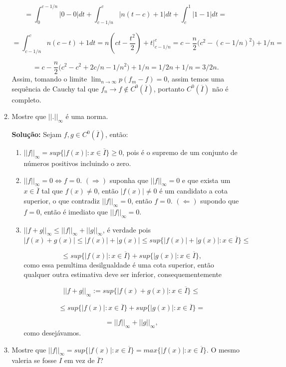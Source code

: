 \documentclass{article}
\begin{document}
\begin{enumerate}
\begin{enumerate}
			$$
			= \int_{0}^{c-1/n}|0 - 0|dt + \int_{c-1/n}^{c}|n(t-c)+1|dt + \int_{c}^{1}|1-1|dt=  
			$$ 
			
			$$
			= \int_{c-1/n}^{c}n(c-t)+1 dt =  n(ct - \frac{t^2}{2}) + t\Big|_{c-1/n}^{c} =  c - \frac{n}{2}\Big(c^2 - (c-1/n)^2 \Big) + 1/n=
			$$
			
			$$
			=  c - \frac{n}{2}\Big(c^2 - c^2+2c/n - 1/n^2  \Big)+ 1/n= 1/2n + 1/n = 3/2n.
			$$
			Assim, tomando o limite $\lim_{n \to \infty}p(f_m - f) = 0$, assim temos uma sequência de Cauchy tal que $f_n \to f \notin C^0(\overline{I})$, portanto $C^0(\overline{I})$ não é completo.
			
			\item Mostre que $||.||_{\infty}$ é uma norma.
			
			\textbf{Solução:} Sejam $f, g \in C^0(\overline{I})$, então:
			\begin{enumerate}
				\item $||f||_{\infty} =  sup\{|f(x)|: x \in \overline{I}\} \geq 0$, pois é o supremo de um conjunto de números positivos incluindo o zero.
				
				\item $||f||_{\infty} =  0 \iff f = 0$. $(\Rightarrow)$ suponha que $||f||_{\infty} =  0$ e que exista um $x \in \overline{I}$ tal que $f(x) \neq 0$, então $|f(x)| \neq 0$ é um candidato a cota superior, o que contradiz $||f||_{\infty} =  0$, então $f=0$. $(\Leftarrow)$ supondo que $f=0$, então é imediato que $||f||_{\infty} =  0$.
				
				\item $||f + g||_{\infty} \leq ||f||_{\infty} + ||g||_{\infty}$, é verdade pois 
				$$
				|f(x) +g(x)|\leq |f(x)| +|g(x)| \leq  sup\{|f(x)|+|g(x)|: x \in \overline{I}\} \leq 
				$$
				
				$$
				\leq sup\{|f(x)|: x \in \overline{I}\} + sup\{|g(x)|: x \in \overline{I}\},
				$$
				como essa penultima desilgualdade é uma cota superior, então qualquer outra estimativa deve ser inferior, consequementemente 
				
				$$
				||f+g||_{\infty} := sup\{|f(x)+g(x)|: x \in \overline{I}\}  \leq 
				$$
				
				$$ 
				\leq sup\{|f(x)|: x \in \overline{I}\} + sup\{|g(x)|: x \in \overline{I}\} = 
				$$ 
				
				$$=||f||_{\infty} + ||g||_{\infty},$$
				como desejávamos.
			\end{enumerate}
			
			\item Mostre que $||f||_{\infty} = sup\{|f(x)|: x \in \overline{I}\} = max\{|f(x)|: x \in \overline{I}\}$. O mesmo valeria se fosse $I$ em vez de $\overline{I}$?
			

\end{enumerate}
\end{enumerate}
\end{document}
